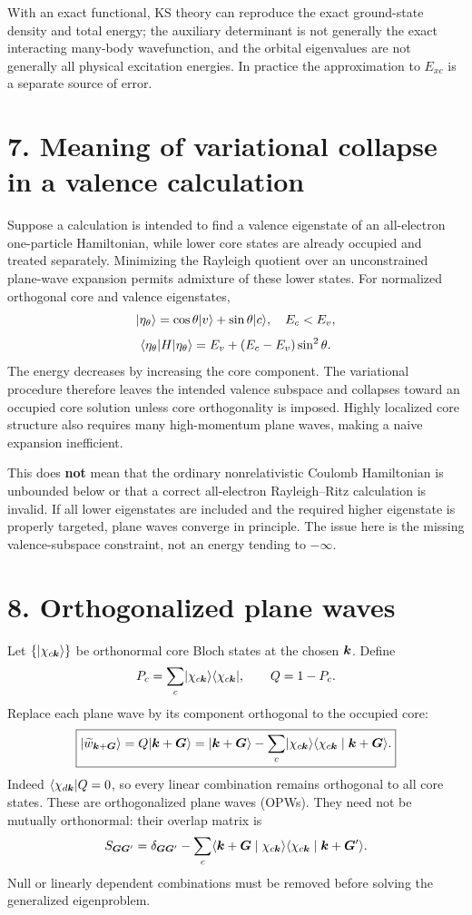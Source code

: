 With an exact functional, KS theory can reproduce the exact ground-state density and total energy; the auxiliary determinant is not generally the exact interacting many-body wavefunction, and the orbital eigenvalues are not generally all physical excitation energies. In practice the approximation to $E_{xc}$ is a separate source of error.

\section*{7. Meaning of variational collapse in a valence calculation}
Suppose a calculation is intended to find a valence eigenstate of an all-electron one-particle Hamiltonian, while lower core states are already occupied and treated separately. Minimizing the Rayleigh quotient over an unconstrained plane-wave expansion permits admixture of these lower states. For normalized orthogonal core and valence eigenstates,
\[
\lvert\eta_\theta\rangle=\cos\theta\lvert v\rangle+\sin\theta\lvert c\rangle,\quad
E_c<E_v,
\]
\[
\langle\eta_\theta\rvert H\lvert\eta_\theta\rangle
=E_v+(E_c-E_v)\sin^2\theta.
\]
The energy decreases by increasing the core component. The variational procedure therefore leaves the intended valence subspace and collapses toward an occupied core solution unless core orthogonality is imposed. Highly localized core structure also requires many high-momentum plane waves, making a naive expansion inefficient.

This does \textbf{not} mean that the ordinary nonrelativistic Coulomb Hamiltonian is unbounded below or that a correct all-electron Rayleigh--Ritz calculation is invalid. If all lower eigenstates are included and the required higher eigenstate is properly targeted, plane waves converge in principle. The issue here is the missing valence-subspace constraint, not an energy tending to $-\infty$.

\section*{8. Orthogonalized plane waves}
Let $\{\lvert\chi_{c\boldsymbol{k}}\rangle\}$ be orthonormal core Bloch states at the chosen $\boldsymbol{k}$. Define
\[
P_c=\sum_c\lvert\chi_{c\boldsymbol{k}}\rangle\langle\chi_{c\boldsymbol{k}}\rvert,\qquad Q=1-P_c.
\]
Replace each plane wave by its component orthogonal to the occupied core:
\[
\boxed{\lvert\widetilde w_{\boldsymbol{k}+\boldsymbol{G}}\rangle
=Q\lvert\boldsymbol{k}+\boldsymbol{G}\rangle
=\lvert\boldsymbol{k}+\boldsymbol{G}\rangle
-\sum_c\lvert\chi_{c\boldsymbol{k}}\rangle\langle\chi_{c\boldsymbol{k}}\mid\boldsymbol{k}+\boldsymbol{G}\rangle.}
\]
Indeed $\langle\chi_{d\boldsymbol{k}}\rvert Q=0$, so every linear combination remains orthogonal to all core states. These are orthogonalized plane waves (OPWs). They need not be mutually orthonormal: their overlap matrix is
\[
S_{\boldsymbol{G}\boldsymbol{G}'}=\delta_{\boldsymbol{G}\boldsymbol{G}'}
-\sum_c\langle\boldsymbol{k}+\boldsymbol{G}\mid\chi_{c\boldsymbol{k}}\rangle
\langle\chi_{c\boldsymbol{k}}\mid\boldsymbol{k}+\boldsymbol{G}'\rangle.
\]
Null or linearly dependent combinations must be removed before solving the generalized eigenproblem.

